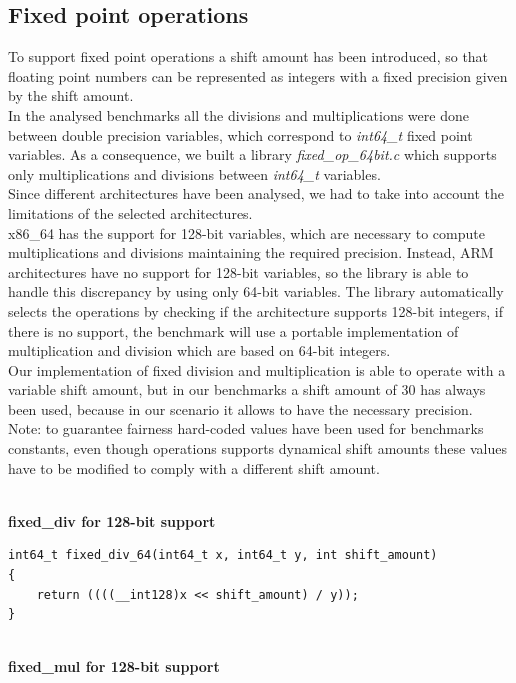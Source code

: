 \subsection{Fixed point operations}

To support fixed point operations a shift amount has been introduced, so that floating point numbers can be represented as integers with a fixed precision given by the shift amount.\\ In the analysed benchmarks all the divisions and multiplications were done between double precision variables, which correspond to \textit{int64\_t} fixed point variables. As a consequence, we built a library \textit{fixed\_op\_64bit.c} which supports only multiplications and divisions between \textit{int64\_t} variables.\\
Since different architectures have been analysed, we had to take into account the limitations of the selected architectures.\\ x86\_64 has the support for 128-bit variables, which are necessary to compute multiplications and divisions maintaining the required precision. Instead, ARM architectures have no support for 128-bit variables, so the library is able to handle this discrepancy by using only 64-bit variables.
The library automatically selects the operations by checking if the architecture supports 128-bit integers, if there is no support, the benchmark will use a portable implementation of multiplication and division which are based on 64-bit integers.\\ Our implementation of fixed division and multiplication is able to operate with a variable shift amount, but in our benchmarks a shift amount of 30 has always been used, because in our scenario it allows to have the necessary precision.\\ Note: to guarantee fairness hard-coded values have been used for benchmarks constants, even though operations supports dynamical shift amounts these values have to be modified to comply with a different shift amount.

\textbf{\\fixed\_div for 128-bit support}

\begin{lstlisting}
int64_t fixed_div_64(int64_t x, int64_t y, int shift_amount)
{
    return ((((__int128)x << shift_amount) / y));
}
\end{lstlisting}

\textbf{\\fixed\_mul for 128-bit support}

